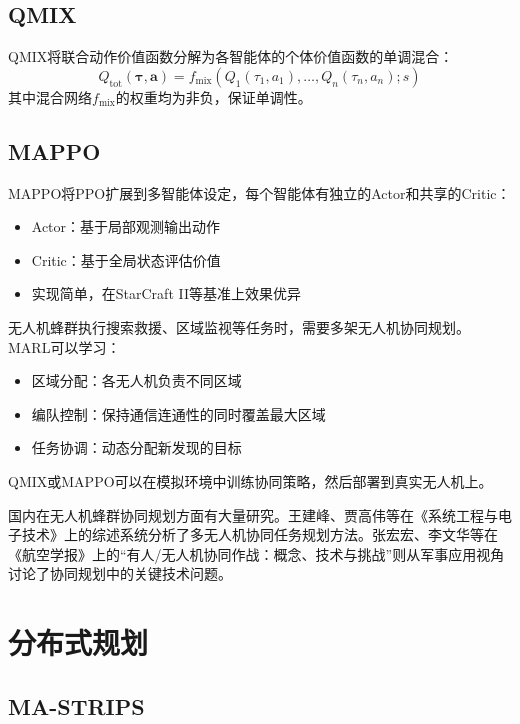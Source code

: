 \subsection{QMIX}

QMIX将联合动作价值函数分解为各智能体的个体价值函数的单调混合：
$$Q_{\mathrm{tot}}(\boldsymbol{\tau}, \mathbf{a}) = f_{\mathrm{mix}}(Q_1(\tau_1, a_1), \ldots, Q_n(\tau_n, a_n); s)$$
其中混合网络$f_{\mathrm{mix}}$的权重均为非负，保证单调性。

\subsection{MAPPO}

MAPPO将PPO扩展到多智能体设定，每个智能体有独立的Actor和共享的Critic：
\begin{itemize}
  \item Actor：基于局部观测输出动作
  \item Critic：基于全局状态评估价值
  \item 实现简单，在StarCraft II等基准上效果优异
\end{itemize}

\begin{appbox}[title={\textbf{应用：无人机蜂群协同}}]
无人机蜂群执行搜索救援、区域监视等任务时，需要多架无人机协同规划。MARL可以学习：
\begin{itemize}
  \item 区域分配：各无人机负责不同区域
  \item 编队控制：保持通信连通性的同时覆盖最大区域
  \item 任务协调：动态分配新发现的目标
\end{itemize}
QMIX或MAPPO可以在模拟环境中训练协同策略，然后部署到真实无人机上。

国内在无人机蜂群协同规划方面有大量研究。王建峰、贾高伟等在《系统工程与电子技术》上的综述系统分析了多无人机协同任务规划方法。张宏宏、李文华等在《航空学报》上的``有人/无人机协同作战：概念、技术与挑战''则从军事应用视角讨论了协同规划中的关键技术问题。
\end{appbox}

\section{分布式规划 \self}

\subsection{MA-STRIPS}

